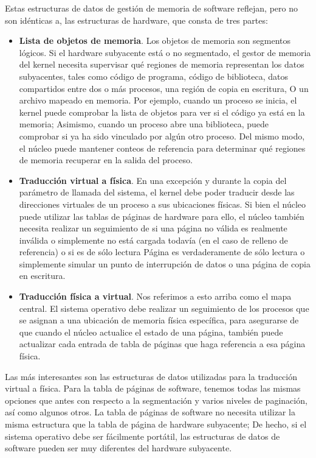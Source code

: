 \documentclass[10pt]{book}
\begin{document}
Estas estructuras de datos de gestión de memoria de software reflejan, pero no son idénticas a, las estructuras de hardware, que consta de tres partes:
\begin{itemize}
\item \textbf{Lista de objetos de memoria}. Los objetos de memoria son segmentos lógicos. Si el hardware subyacente está o no segmentado, el gestor de memoria del kernel necesita supervisar qué regiones de memoria representan los datos subyacentes, tales como código de programa, código de biblioteca, datos compartidos entre dos o más procesos, una región de copia en escritura, O un archivo mapeado en memoria. Por ejemplo, cuando un proceso se inicia, el kernel puede comprobar la lista de objetos para ver si el código ya está en la memoria; Asimismo, cuando un proceso abre una biblioteca, puede comprobar si ya ha sido vinculado por algún otro proceso. Del mismo modo, el núcleo puede mantener conteos de referencia para determinar qué regiones de memoria recuperar en la salida del proceso.

\item \textbf{Traducción virtual a física}. En una excepción y durante la copia del parámetro de llamada del sistema, el kernel debe poder traducir desde las direcciones virtuales de un proceso a sus ubicaciones físicas. Si bien el núcleo puede utilizar las tablas de páginas de hardware para ello, el núcleo también necesita realizar un seguimiento de si una página no válida es realmente inválida o simplemente no está cargada todavía (en el caso de relleno de referencia) o si es de sólo lectura Página es verdaderamente de sólo lectura o simplemente simular un punto de interrupción de datos o una página de copia en escritura.

\item \textbf{Traducción física a virtual}. Nos referimos a esto arriba como el mapa central. El sistema operativo debe realizar un seguimiento de los procesos que se asignan a una ubicación de memoria física específica, para asegurarse de que cuando el núcleo actualice el estado de una página, también puede actualizar cada entrada de tabla de páginas que haga referencia a esa página física.
\end{itemize}

Las más interesantes son las estructuras de datos utilizadas para la traducción virtual a física. Para la tabla de páginas de software, tenemos todas las mismas opciones que antes con respecto a la segmentación y varios niveles de paginación, así como algunos otros. La tabla de páginas de software no necesita utilizar la misma estructura que la tabla de página de hardware subyacente; De hecho, si el sistema operativo debe ser fácilmente portátil, las estructuras de datos de software pueden ser muy diferentes del hardware subyacente.
\end{document}
